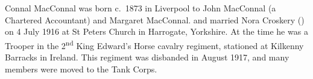 
Connal MacConnal was born c.~1873 in  Liverpool \cite{ConnalNoraMarriage, ConnalFreeBMD} to John MacConnal (a Chartered Accountant) and Margaret MacConnal. \cite{CMacConnalBirth} and married Nora Croskery () on 4 July 1916 at St Peters Church in Harrogate, Yorkshire.\cite{ConnalNoraMarriage} At the time he was a Trooper in the 2\textsuperscript{nd} King Edward's Horse cavalry regiment, stationed at Kilkenny Barracks in Ireland.\cite{ConnalNoraMarriage} This regiment was disbanded in August 1917, and many members were moved to the Tank Corps.\cite{WP-KingEdsHorse}
